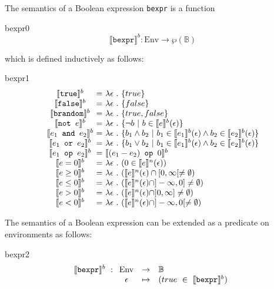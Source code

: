 \documentclass[a4paper,11pt]{article}
\newcommand{\sem}[1]{\llbracket #1 \rrbracket}
\begin{document}
The semantics of a Boolean expression \texttt{bexpr}
is a function %
\htmlonly{\begin{quote}}\begin{image}{bexpr0}
  $$
  \sem{\texttt{bexpr}}^b : \mathrm{Env} \rightarrow \wp(\mathbb{B})
  $$
 \end{image}\htmlonly{\end{quote}}
which is defined inductively as follows:
\htmlonly{\begin{quote}}\begin{image}{bexpr1}
  $$
  \begin{array}{c@{~=~}l}
    \sem{\texttt{true}}^b & \lambda \epsilon~.~\{ true \} \\
    \sem{\texttt{false}}^b & \lambda \epsilon~.~\{ false \} \\
    \sem{\texttt{brandom}}^b & \lambda \epsilon~.~\{ true,false \} \\
    \sem{\texttt{not~} e}^b & \lambda \epsilon~.~\{ \neg b ~|~ b \in \sem{e}^b(\epsilon) \} \\
    \sem{e_1 \texttt{~and~} e_2}^b & \lambda \epsilon~.~\{ b_1\wedge b_2 ~|~ b_1 \in \sem{e_1}^b(\epsilon) \wedge b_2 \in \sem{e_2}^b(\epsilon)\} \\
    \sem{e_1 \texttt{~or~} e_2}^b & \lambda \epsilon~.~\{ b_1\vee b_2 ~|~ b_1 \in \sem{e_1}^b(\epsilon) \wedge b_2 \in \sem{e_2}^b(\epsilon)\} \\
    \sem{e_1 \texttt{~op~} e_2}^b & \sem{(e_1 - e_2) \texttt{~op~} 0}^b \\
    \sem{e=0}^b & \lambda \epsilon ~.~ (0 \in \sem{e}^n(\epsilon)) \\
    \sem{e\geq 0}^b & \lambda \epsilon ~.~ (\sem{e}^n(\epsilon)\cap [0,\infty[ \neq \emptyset) \\
    \sem{e\leq 0}^b & \lambda \epsilon ~.~ (\sem{e}^n(\epsilon)\cap ]-\infty,0] \neq \emptyset) \\
    \sem{e> 0}^b & \lambda \epsilon ~.~ (\sem{e}^n(\epsilon)\cap ]0,\infty] \neq \emptyset) \\
    \sem{e< 0}^b & \lambda \epsilon ~.~ (\sem{e}^n(\epsilon)\cap ]-\infty,0[ \neq \emptyset)
  \end{array}
  $$
 \end{image}\htmlonly{\end{quote}}
The semantics of a Boolean expression can be extended as a predicate on environments as follows:
\htmlonly{\begin{quote}}\begin{image}{bexpr2}
  $$
    \sem{\texttt{bexpr}}^b ~:
    \begin{array}[t]{ccl}
      \mathrm{Env} &\rightarrow& \mathbb{B} \\
      \epsilon &\mapsto& (true ~\in~ \sem{\texttt{bexpr}}^b)
    \end{array}
  $$
 \end{image}\htmlonly{\end{quote}}
\end{document}
